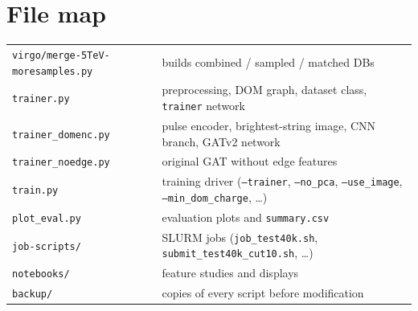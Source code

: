 \documentclass[11pt,a4paper]{article}
\newcommand{\code}[1]{\texttt{#1}}
\begin{document}
\section{File map}
\begin{tabularx}{\textwidth}{lY}
\toprule
\code{virgo/merge-5TeV-moresamples.py} & builds combined / sampled / matched DBs\\
\code{trainer.py} & preprocessing, DOM graph, dataset class, \code{trainer} network\\
\code{trainer\_domenc.py} & pulse encoder, brightest-string image, CNN branch, GATv2 network\\
\code{trainer\_noedge.py} & original GAT without edge features\\
\code{train.py} & training driver (\code{--trainer}, \code{--no\_pca}, \code{--use\_image}, \code{--min\_dom\_charge}, \dots)\\
\code{plot\_eval.py} & evaluation plots and \code{summary.csv}\\
\code{job-scripts/} & SLURM jobs (\code{job\_test40k.sh}, \code{submit\_test40k\_cut10.sh}, \dots)\\
\code{notebooks/} & feature studies and displays\\
\code{backup/} & copies of every script before modification\\
\bottomrule
\end{tabularx}
\end{document}

